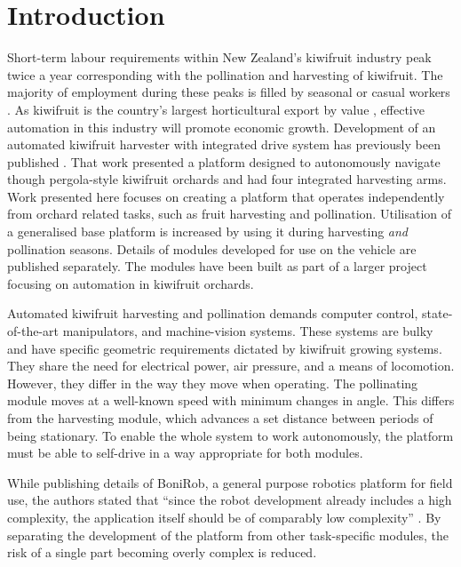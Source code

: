 \documentclass[preprint,authoryear,12pt]{elsarticle}
\begin{document}
\section{Introduction}
\label{sect:intro}
    Short-term labour requirements within New Zealand's kiwifruit industry peak twice a year corresponding with the pollination and harvesting of kiwifruit.
    The majority of employment during these peaks is filled by seasonal or casual workers \citep{Timmins2009}.
    As kiwifruit is the country's largest horticultural export by value \citep{StatisticsNewZealand2015}, effective automation in this industry will promote economic growth.
    Development of an automated kiwifruit harvester with integrated drive system has previously been published \citep{Scarfe2012}.
    That work presented a platform designed to autonomously navigate though pergola-style kiwifruit orchards and had four integrated harvesting arms.
    Work presented here focuses on creating a platform that operates independently from orchard related tasks, such as fruit harvesting and pollination.
    Utilisation of a generalised base platform is increased by using it during harvesting \emph{and} pollination seasons.
    Details of modules developed for use on the vehicle are published separately.
    The modules have been built as part of a larger project focusing on automation in kiwifruit orchards.

    Automated kiwifruit harvesting and pollination demands computer control, state-of-the-art manipulators, and machine-vision systems.
    These systems are bulky and have specific geometric requirements dictated by kiwifruit growing systems.
    They share the need for electrical power, air pressure, and a means of locomotion.
    However, they differ in the way they move when operating.
    The pollinating module moves at a well-known speed with minimum changes in angle.
    This differs from the harvesting module, which advances a set distance between periods of being stationary.
    To enable the whole system to work autonomously, the platform must be able to self-drive in a way appropriate for both modules.

    While publishing details of BoniRob, a general purpose robotics platform for field use, the authors stated that ``since the robot development already includes a high complexity, the application itself should be of comparably low complexity'' \citep{Ruckelshausen2009}.
    By separating the development of the platform from other task-specific modules, the risk of a single part becoming overly complex is reduced.
\end{document}
